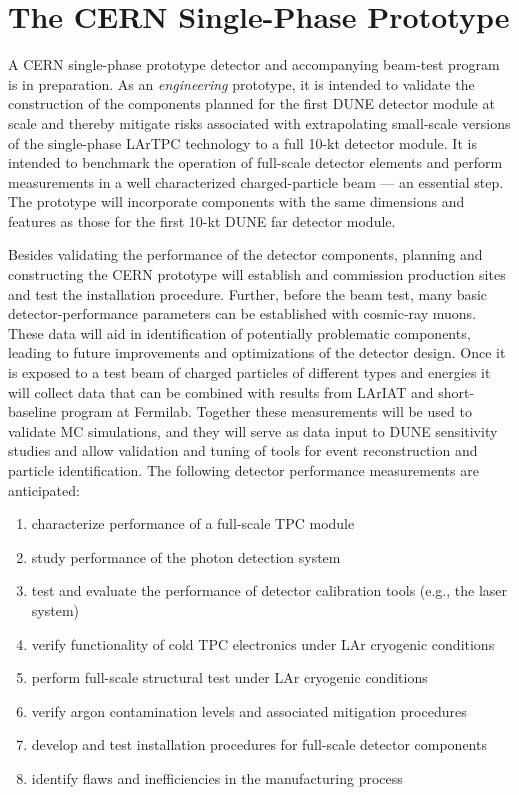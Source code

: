 \section{The CERN Single-Phase Prototype}
\label{sec:proto-cern-single}

A CERN single-phase prototype detector and accompanying beam-test
program is in preparation. As an \textit{engineering} prototype, it is
intended to validate the construction of the components planned for the
first DUNE  detector module at scale and thereby mitigate
risks associated with extrapolating small-scale versions of the
single-phase LArTPC technology to a full 10-kt detector module.  It is
intended to benchmark the operation of full-scale detector
elements and perform measurements in a well characterized
charged-particle beam --- an essential step.
%
The prototype will incorporate components with the same
dimensions and features as those for the first 10-kt DUNE far detector
module. %

Besides validating the performance of the detector components,
planning and constructing the CERN prototype will establish and
commission production sites and test the installation procedure.
Further, before the beam test, many basic detector-performance
parameters can be established with cosmic-ray muons.  These data will
aid in identification of potentially problematic components, leading
to future improvements and optimizations of the detector design.
%
Once it is exposed to a test beam of charged particles of different
types and energies it will collect data that can be combined with
results from LArIAT and short-baseline program at Fermilab. Together
these measurements will be used to validate MC simulations, and they
will serve as data input to DUNE sensitivity studies and allow
validation and tuning of tools for event reconstruction and particle
identification.
The following detector performance measurements are anticipated:
 \begin{enumerate}
 \item characterize performance of a full-scale TPC module
 \item study performance of the photon detection system
 \item test and evaluate the performance of detector calibration tools (e.g., the laser system)
  \item verify functionality of cold TPC electronics under LAr cryogenic conditions
  \item perform full-scale structural test under LAr cryogenic conditions
  \item verify argon contamination levels and associated mitigation procedures
  \item develop and test installation procedures for full-scale detector components
  \item identify flaws and inefficiencies in the manufacturing process
\end{enumerate}


